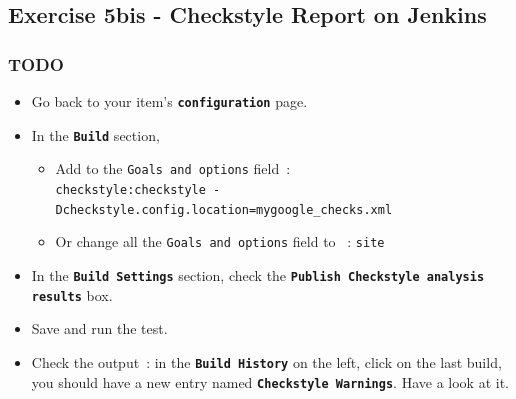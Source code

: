 \documentclass{article}
\begin{document}
\subsection{Exercise 5bis - Checkstyle Report on Jenkins}

\subsubsection{TODO}
\begin{itemize}
\item Go back to your item's \textbf{\texttt{configuration}} page.
\item In the \textbf{\texttt{Build}} section, 
\begin{itemize}
\item Add to the \texttt{Goals and options} field~:\\
\texttt{checkstyle:checkstyle -Dcheckstyle.config.location=mygoogle\_checks.xml}
\item Or change all the \texttt{Goals and options} field to ~: \texttt{site}
\end{itemize}
\item In the \textbf{\texttt{Build Settings}} section, check the \textbf{\texttt{Publish Checkstyle analysis results}} box.
\item Save and run the test.
\item Check the output~: in the \textbf{\texttt{Build History}} on the left, click on the last build, you should have a new entry named \textbf{\texttt{Checkstyle Warnings}}. Have a look at it.
\end{itemize}

\clearpage
\end{document}
